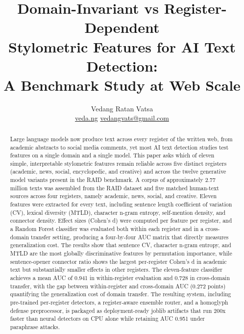 \documentclass{article}
\title{Domain-Invariant vs Register-Dependent\\Stylometric Features for AI Text Detection:\\A Benchmark Study at Web Scale}
\author{Vedang Ratan Vatsa \\
\href{https://veda.ng}{veda.ng} \textperiodcentered{} \href{mailto:vedangvats@gmail.com}{vedangvats@gmail.com}}
\begin{document}
\raggedbottom

\maketitle

\begin{abstract}
Large language models now produce text across every register of the written web, from academic abstracts to social media comments, yet most AI text detection studies test features on a single domain and a single model. This paper asks which of eleven simple, interpretable stylometric features remain reliable across five distinct registers (academic, news, social, encyclopedic, and creative) and across the twelve generative model variants present in the RAID benchmark. A corpus of approximately 2.77 million texts was assembled from the RAID dataset and five matched human-text sources across four registers, namely academic, news, social, and creative. Eleven features were extracted for every text, including sentence length coefficient of variation (CV), lexical diversity (MTLD), character n-gram entropy, self-mention density, and connector density. Effect sizes (Cohen's d) were computed per feature per register, and a Random Forest classifier was evaluated both within each register and in a cross-domain transfer setting, producing a four-by-four AUC matrix that directly measures generalization cost. The results show that sentence CV, character n-gram entropy, and MTLD are the most globally discriminative features by permutation importance, while sentence-opener connector ratio shows the largest per-register Cohen's d in academic text but substantially smaller effects in other registers. The eleven-feature classifier achieves a mean AUC of 0.941 in within-register evaluation and 0.728 in cross-domain transfer, with the gap between within-register and cross-domain AUC (0.272 points) quantifying the generalization cost of domain transfer. The resulting system, including pre-trained per-register detectors, a register-aware ensemble router, and a homoglyph defense preprocessor, is packaged as deployment-ready joblib artifacts that run 200x faster than neural detectors on CPU alone while retaining AUC 0.951 under paraphrase attacks.
\end{abstract}
\end{document}
